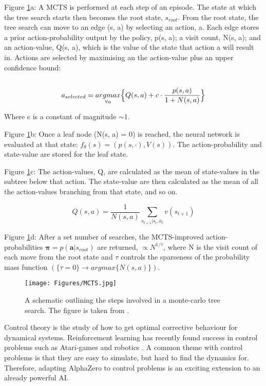 \documentclass[11.7pt]{article}
\begin{document}
Figure \ref{fig:MCTS}a:
A MCTS is performed at each step of an episode. The state at which the tree search starts then becomes the root state, $s_{root}$. From the root state, the tree search can move to an edge (s, a) by selecting an action, a. Each edge stores a prior action-probability output by the policy, p(s, a); a visit count, N(s, a); and an action-value, Q(s, a), which is the value of the state that action a will result in. Actions are selected by maximising an the action-value plus an upper confidence bound: \\ \\

\begin{equation}
   a_{selected} = \underset{\forall a}{argmax} \Big{\{}Q(s, a) + c \cdot \frac{p(s, a)}{1 + N(s, a)}\Big{\}}
   \label{eqn:ucb}
\end{equation}

Where c is a constant of magnitude $\sim 1$.

Figure \ref{fig:MCTS}b:
Once a leaf node (N(s, a) = 0) is reached, the neural network is evaluated at that state: $f_\theta (s) = (p(s, \cdot), V(s))$. The action-probability and state-value are stored for the leaf state.

Figure \ref{fig:MCTS}c:
The action-values, Q, are calculated as the mean of state-values in the subtree below that action. The state-value are then calculated as the mean of all the action-values branching from that state, and so on.

\begin{equation}
   Q(s, a) = \frac{1}{N(s, a)} \sum_{s_{t+1} | s_t, a_t} v(s_{t+1})
   \label{eqn:actionvalue}
\end{equation} 

Figure \ref{fig:MCTS}d:
After a set number of searches, the MCTS-improved action-probabilities $\boldsymbol{\pi} = p(\boldsymbol{a} | s_{root})$ are returned, $\propto N^{1/\tau}$, where N is the visit count of each move from the root state and $\tau$ controls the sparseness of the probability mass function $(\{\tau = 0\} \rightarrow argmax\{N(s, a)\})$.

\begin{figure}[H]
   \centering
   \texttt{[image: Figures/MCTS.jpg]}
   \caption{\label{fig:MCTS} A schematic outlining the steps involved in a monte-carlo tree search. The figure is taken from \cite{AlphaGoZero}.}
\end{figure}

Control theory is the study of how to get optimal corrective behaviour for dynamical systems. Reinforcement learning has recently found success in control problems such as Atari-games and robotics \cite{RLoverview}. A common theme with control problems is that they are easy to simulate, but hard to find the dynamics for. Therefore, adapting AlphaZero to control problems is an exciting extension to an already powerful AI.
\end{document}
